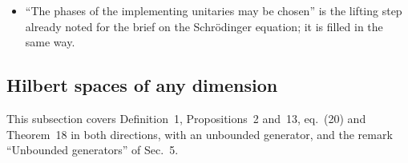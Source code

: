 \documentclass[11pt]{article}
\begin{document}
\begin{itemize}
  only as $\lim_n (\Psi_{t/n})^n$. With $t/s$ irrational and $\tau = (t+s)/N$, the block of
  $k = \lfloor t/\tau\rfloor$ steps is $\Psi_\tau^k$, which is not of the form $(\Psi_{t/k})^k$,
  and DR-PROJ says nothing about its limit. Comparing $(\Psi_a)^k$ with $(\Psi_b)^k$ for nearby
  $a, b$ needs the $o(\tau)$ in eq.~(26) to be uniform along the states $\Psi_b^j\rho$, while
  eq.~(26) holds for each $\rho$ separately. Continuity at zero does not supply this. In finite
  dimension $L$ is bounded, eq.~(26) holds in operator norm, and telescoping gives
  $\|(\Psi_{t/n})^n - e^{tL}\| \le n\,o(t/n)\,e^{t\|L\|} \to 0$, so $\Phi_t = e^{tL}$ and
  composition follow at once (formalized, ). In infinite
  dimension Chernoff's product formula gives the same,
  uniformly on compact $t$-intervals, provided the closure of $L$ generates a contraction
  semigroup; the brief's ``single, possibly unbounded generator $L$'' must be read to include
  this, or it must be assumed.
\item ``The phases of the implementing unitaries may be chosen'' is the lifting step already noted
  for the brief on the Schr\"odinger equation; it is filled in the same way.
\end{itemize}

\subsection{Hilbert spaces of any dimension}\label{sec:unitary-projective-any-dim}

This subsection covers Definition~1, Propositions~2 and~13, eq.~(20) and Theorem~18 in both
directions, with an unbounded generator, and the remark ``Unbounded generators'' of Sec.~5.
\end{document}
